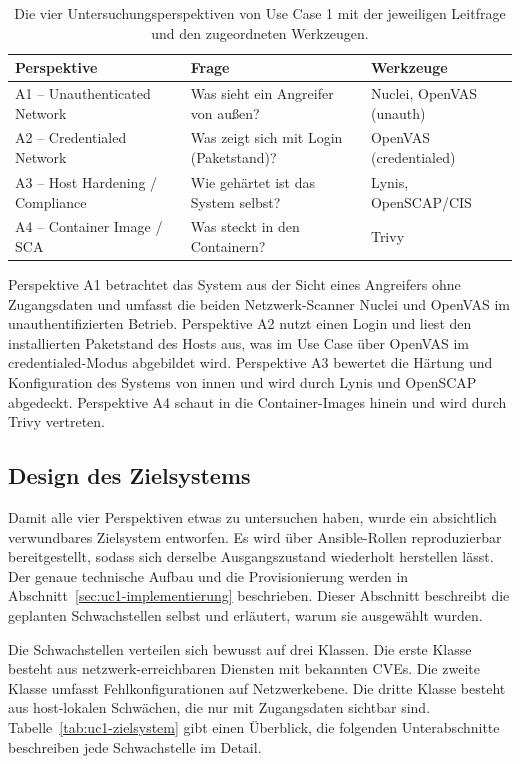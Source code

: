 \begin{table}[H]
\centering
\renewcommand{\arraystretch}{1.3}
\begin{tabular}{p{2.2cm}p{6.0cm}p{4.2cm}}
\hline
\textbf{Perspektive} & \textbf{Frage} & \textbf{Werkzeuge} \\
\hline
A1 -- Unauthenticated Network & Was sieht ein Angreifer von außen? & Nuclei, OpenVAS (unauth) \\
A2 -- Credentialed Network & Was zeigt sich mit Login (Paketstand)? & OpenVAS (credentialed) \\
A3 -- Host Hardening / Compliance & Wie gehärtet ist das System selbst? & Lynis, OpenSCAP/CIS \\
A4 -- Container Image / SCA & Was steckt in den Containern? & Trivy \\
\hline
\end{tabular}
\caption{Die vier Untersuchungsperspektiven von Use Case 1 mit der jeweiligen Leitfrage und den zugeordneten Werkzeugen.}
\label{tab:uc1-perspektiven}
\end{table}

Perspektive A1 betrachtet das System aus der Sicht eines Angreifers ohne Zugangsdaten und umfasst die
beiden Netzwerk-Scanner Nuclei und OpenVAS im unauthentifizierten Betrieb. Perspektive A2 nutzt einen
Login und liest den installierten Paketstand des Hosts aus, was im Use Case über OpenVAS im
credentialed-Modus abgebildet wird. Perspektive A3 bewertet die Härtung und Konfiguration des Systems
von innen und wird durch Lynis und OpenSCAP abgedeckt. Perspektive A4 schaut in die Container-Images
hinein und wird durch Trivy vertreten.

\subsection{Design des Zielsystems}
\label{subsec:uc1-ziel-design}

Damit alle vier Perspektiven etwas zu untersuchen haben, wurde ein absichtlich verwundbares
Zielsystem entworfen. Es wird über Ansible-Rollen reproduzierbar bereitgestellt, sodass sich derselbe
Ausgangszustand wiederholt herstellen lässt. Der genaue technische Aufbau und die Provisionierung
werden in Abschnitt~\ref{sec:uc1-implementierung} beschrieben. Dieser Abschnitt beschreibt die
geplanten Schwachstellen selbst und erläutert, warum sie ausgewählt wurden.

Die Schwachstellen verteilen sich bewusst auf drei Klassen. Die erste Klasse besteht aus
netzwerk-erreichbaren Diensten mit bekannten CVEs. Die zweite Klasse umfasst Fehlkonfigurationen auf
Netzwerkebene. Die dritte Klasse besteht aus host-lokalen Schwächen, die nur mit Zugangsdaten
sichtbar sind. Tabelle~\ref{tab:uc1-zielsystem} gibt einen Überblick, die folgenden Unterabschnitte
beschreiben jede Schwachstelle im Detail.

